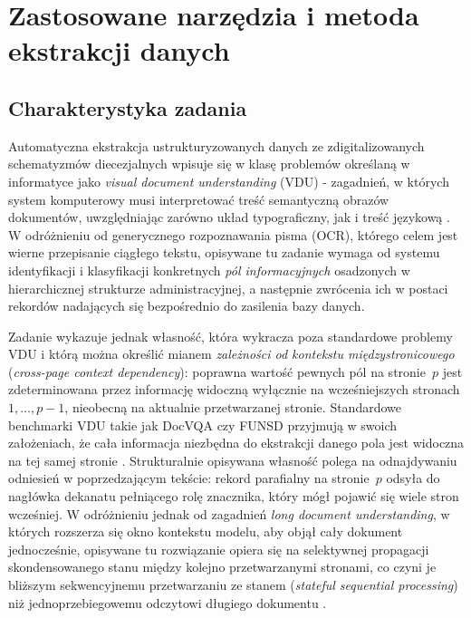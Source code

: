 
\chapter{Zastosowane narzędzia i metoda ekstrakcji danych}\label{ch3_metoda}

\section{Charakterystyka zadania}\label{sec:charakterystyka_zadania}

Automatyczna ekstrakcja ustrukturyzowanych danych ze zdigitalizowanych schematyzmów diecezjalnych wpisuje się w klasę problemów określaną w informatyce jako \textit{visual document understanding} (VDU) - zagadnień, w których system komputerowy musi interpretować treść semantyczną obrazów dokumentów, uwzględniając zarówno układ typograficzny, jak i treść językową \parencite{mathew2021docvqa,jaume2019funsd}.
W odróżnieniu od generycznego rozpoznawania pisma (OCR), którego celem jest wierne przepisanie ciągłego tekstu, opisywane tu zadanie wymaga od systemu identyfikacji i klasyfikacji konkretnych \textit{pól informacyjnych} osadzonych w hierarchicznej strukturze administracyjnej, a następnie zwrócenia ich w postaci rekordów nadających się bezpośrednio do zasilenia bazy danych.

Zadanie wykazuje jednak własność, która wykracza poza standardowe problemy VDU i którą można określić mianem \textit{zależności od kontekstu międzystronicowego} (\textit{cross-page context dependency}): poprawna wartość pewnych pól na stronie~$p$ jest zdeterminowana przez informację widoczną wyłącznie na wcześniejszych stronach $1, \ldots, p-1$, nieobecną na aktualnie przetwarzanej stronie.
Standardowe benchmarki VDU takie jak DocVQA czy FUNSD przyjmują w swoich założeniach, że cała informacja niezbędna do ekstrakcji danego pola jest widoczna na tej samej stronie \parencite{mathew2021docvqa,jaume2019funsd}.
Strukturalnie opisywana własność polega na odnajdywaniu odniesień w poprzedzającym tekście: rekord parafialny na stronie~$p$ odsyła do nagłówka dekanatu pełniącego rolę znacznika, który mógł pojawić się wiele stron wcześniej.
W odróżnieniu jednak od zagadnień \textit{long document understanding}, w których rozszerza się okno kontekstu modelu, aby objął cały dokument jednocześnie, opisywane tu rozwiązanie opiera się na selektywnej propagacji skondensowanego stanu między kolejno przetwarzanymi stronami, co czyni je bliższym sekwencyjnemu przetwarzaniu ze stanem (\textit{stateful sequential processing}) niż jednoprzebiegowemu odczytowi długiego dokumentu \parencite{beltagy2020longformer,liu2023lostmiddlelanguagemodels}.

